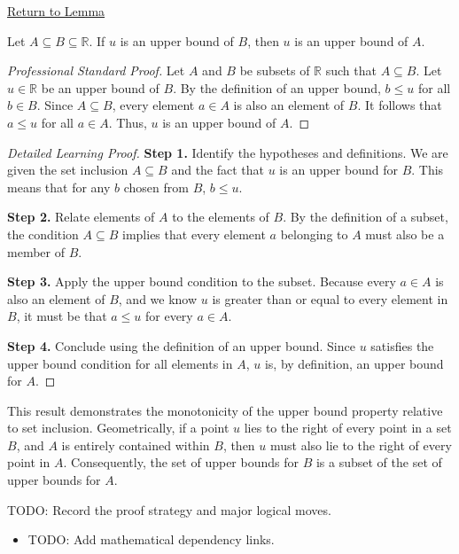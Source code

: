 \newpage
{}
\label{prf:subset-inclusion-preserves-upper-bounds}

\begin{remark*}[Return]
\hyperref[lem:subset-inclusion-preserves-upper-bounds]{Return to Lemma}
\end{remark*}

\begin{lemma*}
Let $A \subseteq B \subseteq \mathbb{R}$. If $u$ is an upper bound of $B$, then $u$ is an upper bound of $A$.
\end{lemma*}

\begin{proof}[Professional Standard Proof]
\LRAProofBodyStart
Let $A$ and $B$ be subsets of $\mathbb{R}$ such that $A \subseteq B$. Let $u \in \mathbb{R}$ be an upper bound of $B$. By the definition of an upper bound, $b \le u$ for all $b \in B$. Since $A \subseteq B$, every element $a \in A$ is also an element of $B$. It follows that $a \le u$ for all $a \in A$. Thus, $u$ is an upper bound of $A$.
\end{proof}

\begin{proof}[Detailed Learning Proof]
\LRAProofBodyStart
\textbf{Step 1.} Identify the hypotheses and definitions.
We are given the set inclusion $A \subseteq B$ and the fact that $u$ is an upper bound for $B$. This means that for any $b$ chosen from $B$, $b \le u$.

\textbf{Step 2.} Relate elements of $A$ to the elements of $B$.
By the definition of a subset, the condition $A \subseteq B$ implies that every element $a$ belonging to $A$ must also be a member of $B$.

\textbf{Step 3.} Apply the upper bound condition to the subset.
Because every $a \in A$ is also an element of $B$, and we know $u$ is greater than or equal to every element in $B$, it must be that $a \le u$ for every $a \in A$.

\textbf{Step 4.} Conclude using the definition of an upper bound.
Since $u$ satisfies the upper bound condition for all elements in $A$, $u$ is, by definition, an upper bound for $A$.
\end{proof}

\begin{remark*}[Interpretation]
This result demonstrates the monotonicity of the upper bound property relative to set inclusion. Geometrically, if a point $u$ lies to the right of every point in a set $B$, and $A$ is entirely contained within $B$, then $u$ must also lie to the right of every point in $A$. Consequently, the set of upper bounds for $B$ is a subset of the set of upper bounds for $A$.
\end{remark*}

\begin{remark*}
TODO: Record the proof strategy and major logical moves.
\end{remark*}

\begin{dependencies}
\begin{itemize}
  \item TODO: Add mathematical dependency links.
\end{itemize}
\end{dependencies}

\clearpage
